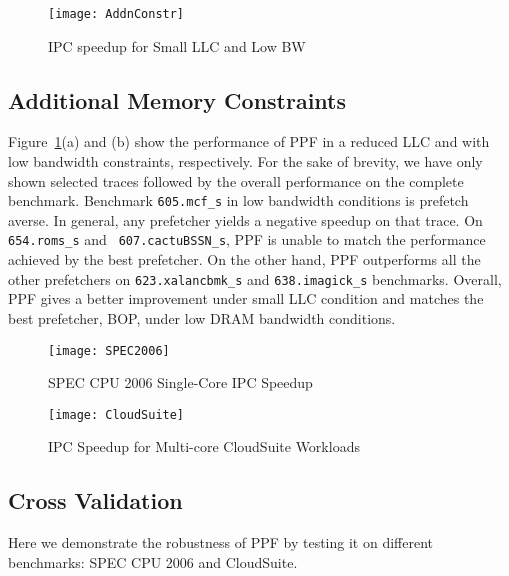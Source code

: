 \begin{figure}[ht]
\begin{adjustwidth}{-1cm}{}
  \texttt{[image: AddnConstr]}
  \caption{IPC speedup for Small LLC and Low BW}
  \label{Fig:AddnConstr}
\end{adjustwidth}
\end{figure}

\subsection{Additional Memory Constraints}
\label{Results-AdditionalMem}

Figure~\ref{Fig:AddnConstr}(a) and (b) show the performance of PPF in a
reduced LLC and with low bandwidth constraints, respectively. For the sake of
brevity, we have only shown selected traces followed by the overall
performance on the complete benchmark.  Benchmark {\tt 605.mcf\_s} in low
bandwidth conditions is prefetch averse.  In general, any prefetcher yields a
negative speedup on that trace.  On {\tt 654.roms\_s} and {\tt
607.cactuBSSN\_s}, PPF is unable to match the performance achieved by the best
prefetcher. On the other hand, PPF outperforms all the other prefetchers on
{\tt 623.xalancbmk\_s} and {\tt 638.imagick\_s} benchmarks.  Overall, PPF gives
a better improvement under small LLC condition and matches the best
prefetcher, BOP, under low DRAM bandwidth conditions.

\begin{figure}[ht]
\texttt{[image: SPEC2006]}
\caption{SPEC CPU 2006 Single-Core IPC Speedup}
\label{Fig:SPEC2006_1core}
\end{figure}

\begin{figure}[ht]
\texttt{[image: CloudSuite]}
\caption{IPC Speedup for Multi-core CloudSuite Workloads}
\label{Fig:CloudSuite}
\end{figure}

\subsection{Cross Validation}
\label{Results-CrossVal}


Here we demonstrate the robustness of PPF by testing it on different
benchmarks: SPEC CPU 2006 and CloudSuite.

